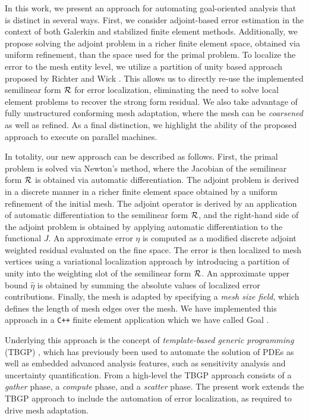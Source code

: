 In this work, we present an approach for automating goal-oriented
analysis that is distinct in several ways. First, we consider adjoint-based
error estimation in the context of both Galerkin and stabilized finite element
methods. Additionally, we propose solving the adjoint problem in a richer
finite element space, obtained via uniform refinement, than the space used for
the primal problem. To localize the error to the mesh entity level,
we utilize a partition of unity based approach proposed by Richter
and Wick \cite{richter2015variational}. This allows us to directly re-use the
implemented semilinear form $\mathcal{R}$ for error localization, eliminating the need
to solve local element problems to recover the strong form residual. We also
take advantage of fully unstructured conforming mesh adaptation, where the
mesh can be \emph{coarsened} as well as refined. As a final distinction, we
highlight the ability of the proposed approach to execute on parallel machines.

In totality, our new approach can be described as follows. First, the primal
problem is solved via Newton's method, where the Jacobian of the semilinear
form $\mathcal{R}$ is obtained via automatic differentiation. The adjoint problem is
derived in a discrete manner in a richer finite element space obtained by a
uniform refinement of the initial mesh. The adjoint operator is derived by an
application of automatic differentiation to the semilinear form $\mathcal{R}$, and the
right-hand side of the adjoint problem is obtained by applying automatic
differentiation to the functional $J$. An approximate error $\eta$ is computed
as a modified discrete adjoint weighted residual evaluated on the fine space.
The error is then localized to mesh vertices using a variational localization
approach by introducing a partition of unity into the weighting slot of the semilinear form
$\mathcal{R}$. An approximate upper bound $\hat{\eta}$ is obtained by summing the
absolute values of localized error contributions. Finally, the mesh is adapted
by specifying a \emph{mesh size field}, which defines the length of mesh
edges over the mesh. We have implemented this approach in a \texttt{C++}
finite element application which we have called Goal \cite{goal_github}.

Underlying this approach is the concept of \emph{template-based generic
programming} (TBGP) \cite{pawlowski2012automating1, pawlowski2012automating2},
which has previously been used to automate the solution of PDEs as well as
embedded advanced analysis features, such as
sensitivity analysis and uncertainty quantification. From a high-level the
TBGP approach consists of a \emph{gather} phase, a \emph{compute} phase,
and a \emph{scatter} phase. The present work extends the TBGP approach to
include the automation of error localization, as required to drive
mesh adaptation.

